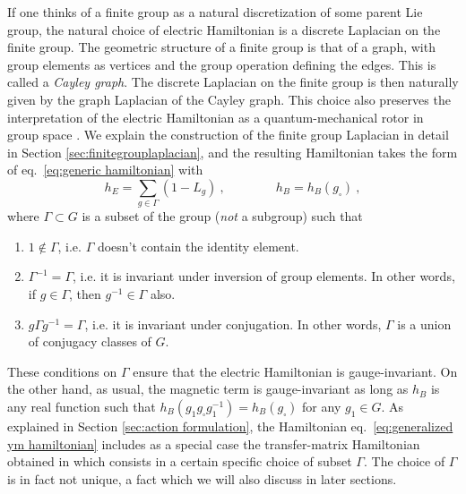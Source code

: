 If one thinks of a finite group as a natural discretization of some parent Lie group, the natural choice of electric Hamiltonian is a discrete Laplacian on the finite group.
The geometric structure of a finite group is that of a graph, with group elements as vertices and the group operation defining the edges.
This is called a \textit{Cayley graph}.
The discrete Laplacian on the finite group is then naturally given by the graph Laplacian of the Cayley graph.
This choice also preserves the interpretation of the electric Hamiltonian as a quantum-mechanical rotor in group space \cite{kogut2975hamiltonian}.
We explain the construction of the finite group Laplacian in detail in Section \ref{sec:finitegrouplaplacian}, and the resulting Hamiltonian takes the form of eq.~\eqref{eq:generic hamiltonian} with
\begin{equation}
    \label{eq:generalized ym hamiltonian}
    h_E = \sum_{g \in \Gamma} (1-L_g)  \ , \quad \quad \quad \quad h_B= h_B (g_\square) \ ,
\end{equation}
where $\Gamma \subset G$ is a subset of the group (\textit{not} a subgroup) such that
\begin{enumerate}
    \item $1 \not \in \Gamma$, i.e. $\Gamma$ doesn't contain the identity element.
    \item $\Gamma^{-1}=\Gamma$, i.e. it is invariant under inversion of group elements.
In other words, if $g \in \Gamma$, then $g^{-1} \in \Gamma$ also.
    \item $g \Gamma g^{-1} = \Gamma$, i.e. it is invariant under conjugation.
In other words, $\Gamma$ is a union of conjugacy classes of $G$.
\end{enumerate}
These conditions on $\Gamma$ ensure that the electric Hamiltonian is gauge-invariant.
On the other hand, as usual, the magnetic term is gauge-invariant as long as $h_B$ is any real function such that $h_B(g_1 g_\square g_1^{-1})=h_B(g_\square)$ for any $g_1 \in G$.
As explained in Section \ref{sec:action formulation}, the Hamiltonian eq.~\eqref{eq:generalized ym hamiltonian} includes as a special case the transfer-matrix Hamiltonian obtained in \cite{TransferMatrixFiniteGroup} which consists in a certain specific choice of subset $\Gamma$.
The choice of $\Gamma$ is in fact not unique, a fact which we will also discuss in later sections.

